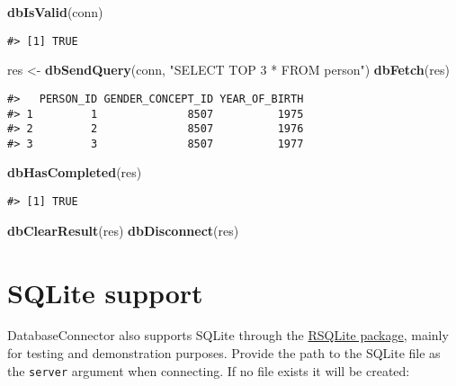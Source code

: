 \documentclass[]{article}
\newenvironment{Shaded}{\begin{snugshade}}{\end{snugshade}}
\newcommand{\KeywordTok}[1]{\textcolor[rgb]{0.13,0.29,0.53}{\textbf{#1}}}
\newcommand{\NormalTok}[1]{#1}
\newcommand{\StringTok}[1]{\textcolor[rgb]{0.31,0.60,0.02}{#1}}
\begin{document}
\begin{Shaded}
\begin{Highlighting}[]
\KeywordTok{dbIsValid}\NormalTok{(conn)}
\end{Highlighting}
\end{Shaded}

\begin{verbatim}
#> [1] TRUE
\end{verbatim}

\begin{Shaded}
\begin{Highlighting}[]
\NormalTok{res <-}\StringTok{ }\KeywordTok{dbSendQuery}\NormalTok{(conn, }\StringTok{"SELECT TOP 3 * FROM person"}\NormalTok{)}
\KeywordTok{dbFetch}\NormalTok{(res)}
\end{Highlighting}
\end{Shaded}

\begin{verbatim}
#>   PERSON_ID GENDER_CONCEPT_ID YEAR_OF_BIRTH
#> 1         1              8507          1975
#> 2         2              8507          1976
#> 3         3              8507          1977
\end{verbatim}

\begin{Shaded}
\begin{Highlighting}[]
\KeywordTok{dbHasCompleted}\NormalTok{(res)}
\end{Highlighting}
\end{Shaded}

\begin{verbatim}
#> [1] TRUE
\end{verbatim}

\begin{Shaded}
\begin{Highlighting}[]
\KeywordTok{dbClearResult}\NormalTok{(res)}
\KeywordTok{dbDisconnect}\NormalTok{(res)}
\end{Highlighting}
\end{Shaded}

\hypertarget{sqlite-support}{%
\section{SQLite support}\label{sqlite-support}}

DatabaseConnector also supports SQLite through the
\href{https://cran.r-project.org/web/packages/RSQLite/index.html}{RSQLite
package}, mainly for testing and demonstration purposes. Provide the
path to the SQLite file as the \texttt{server} argument when connecting.
If no file exists it will be created:
\end{document}
